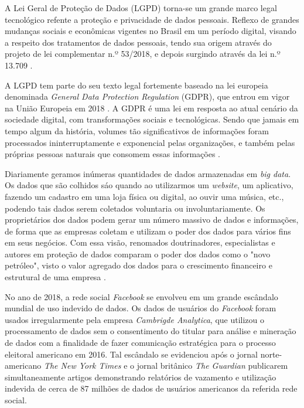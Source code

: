 \documentclass[
	12pt,				%
	openright,			%
	oneside,			%
	a4paper,			%
	english,			%
	french,				%
	spanish,			%
	brazil,				%
	]{abntex2}
\begin{document}
A Lei Geral de Proteção de Dados (LGPD) torna-se um grande marco legal tecnológico refente a proteção e privacidade de dados pessoais. Reflexo de grandes mudanças sociais e econômicas vigentes no Brasil em um período digital, visando a respeito dos tratamentos de dados pessoais, tendo sua origem através do projeto de lei complementar n.º 53/2018, e depois surgindo através da lei n.º 13.709 \cite{01-01-LeiGeral}. 

A LGPD tem parte do seu texto legal fortemente baseado na lei europeia denominada \textit{General Data Protection Regulation} (GDPR), que entrou em vigor na União Europeia em 2018 \cite{02-01-Redecker2021}. A GDPR é uma lei em resposta ao atual cenário da sociedade digital, com transformações sociais e tecnológicas. Sendo que jamais em tempo algum da história, volumes tão significativos de informações foram processados ininterruptamente e exponencial pelas organizações, e também pelas próprias pessoas naturais que consomem essas informações \cite{02-01-Vainzof2020}.

Diariamente geramos inúmeras quantidades de dados armazenadas em \textit{big data}. Os dados que são colhidos sáo quando ao utilizarmos um \textit{website}, um aplicativo, fazendo um cadastro em uma loja física ou digital, ao ouvir uma música, etc., podendo tais dados serem coletados voluntaria ou involuntariamente. Os proprietários dos dados podem gerar um número massivo de dados e informações, de forma que as empresas coletam e utilizam o poder dos dados para vários fins em seus negócios. Com essa visão, renomados doutrinadores, especialistas e autores em proteção de dados comparam o poder dos dados como o "novo petróleo", visto o valor agregado dos dados para o crescimento financeiro e estrutural de uma empresa \cite{02-01-Jobim2021}. 

No ano de 2018, a rede social \textit{Facebook} se envolveu em um grande escândalo mundial de uso indevido de dados. Os  dados de usuários do \textit{Facebook}  foram usados irregularmente pela empresa \textit{Cambrigde Analytica}, que utilizou o processamento de dados sem o consentimento do titular para análise e mineração de dados com a finalidade de fazer comunicação estratégica para o processo eleitoral americano em 2016.
Tal escândalo se evidenciou após o jornal norte-americano \textit{The New York Times} \cite{01-03-Rosenberg2018} e o jornal britânico \textit{The Guardian} \cite{01-04-Graham} publicarem simultaneamente artigos demonstrando relatórios de vazamento e utilização indevida de cerca de 87 milhões de dados de usuários americanos da referida rede social. 
\end{document}
